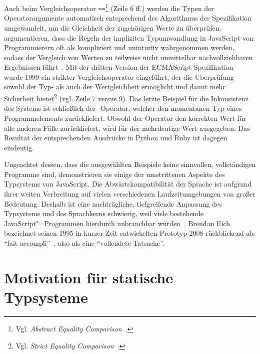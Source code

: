 Auch beim Vergleichsoperator \texttt{==}\footnote{Vgl. \textit{Abstract Equality Comparison}~\autocite[68]{ECMASCRIPT:2019}.} (Zeile 6 ff.) werden die Typen der Operatorargumente automatisch entsprechend des Algorithmus der Spezifikation umgewandelt, um die Gleichheit der zugehörigen Werte zu überprüfen. \citeauthor{PRADEL:2015} argumentieren, dass die Regeln der impliziten Typumwandlung in JavaScript von Programmierern oft als kompliziert und unintuitiv wahrgenommen werden, sodass der Vergleich von Werten zu teilweise nicht unmittelbar nachvollziehbaren Ergebnissen führt~\autocite{PRADEL:2015}.
Mit der dritten Version der ECMAScript-Spezifikation~\autocite{ECMASCRIPT:1999} wurde 1999 ein strikter Vergleichsoperator \code{===} eingeführt, der die Überprüfung sowohl der Typ- als auch der Wertgleichheit ermöglicht und damit mehr Sicherheit bietet\footnote{Vgl. \textit{Strict Equality Comparison}~\autocite[68]{ECMASCRIPT:2019}.} (vgl. Zeile 7 versus 9).
Das letzte Beispiel für die Inkonsistenz des Systems ist schließlich der -Operator, welcher den momentanen Typ eines Programmelements zurückliefert. Obwohl der Operator den korrekten Wert für alle anderen Fälle zurückliefert, wird für  der mehrdeutige Wert  ausgegeben. Das Resultat der entsprechenden Ausdrücke in Python und Ruby ist dagegen eindeutig.

Ungeachtet dessen, dass die ausgewählten Beispiele keine sinnvollen, vollständigen Programme sind, demonstrieren sie einige der umstrittenen Aspekte des Typsystems von JavaScript. Die Abwärtskompatibilität der Sprache ist aufgrund ihrer weiten Verbreitung auf vielen verschiedenen Laufzeitumgebungen von großer Bedeutung. Deshalb ist eine nachträgliche, tiefgreifende Anpassung des Typsystems und des Sprachkerns schwierig, weil viele bestehende JavaScript"=Programmen hierdurch unbrauchbar würden~\autocite[1]{CROCKFORD:JS_GOOD_PARTS}. Brendan Eich bezeichnet seinen 1995 in kurzer Zeit entwickelten Prototyp 2008 rückblickend als \enquote{fait accompli}~\autocite{EICH:POPULARITY}, also als eine \enquote{vollendete Tatsache}.

\section{Motivation für statische Typsysteme}

